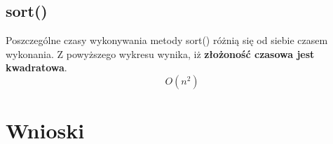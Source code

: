 \documentclass[12pt]{article}
\begin{document}
\begin{multicols}{2}
\subsection{sort()}

\begin{figure}[H]
    \centering
    
    \label{graph: sort}
    
\end{figure}
{\small Poszczególne czasy wykonywania metody sort() różnią się od siebie czasem wykonania. Z powyższego wykresu wynika, iż \textbf{złożoność czasowa jest kwadratowa}.}
\Large{
\begin{equation*}
    O(n^2)
\end{equation*}}
\end{multicols}

\section{Wnioski}
\end{document}
